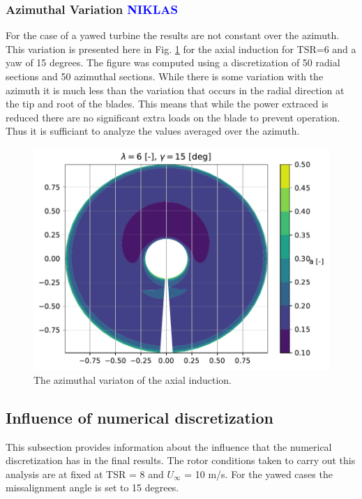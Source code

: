 \subsubsection{\textbf{Azimuthal Variation} \textcolor{blue}{NIKLAS}}
For the case of a yawed turbine the results are not constant over the azimuth. This variation is presented here in Fig. \ref{img:contour} for the axial induction for TSR=6 and a yaw of 15 degrees. The figure was computed using a discretization of 50 radial sections and 50 azimuthal sections. While there is some variation with the azimuth it is much less than the variation that occurs in the radial direction at the tip and root of the blades. This means that while the power extraced is reduced there are no significant extra loads on the blade to prevent operation. Thus it is sufficiant to analyze the values averaged over the azimuth.

\begin{figure}[htbp]
	\centering
	\includegraphics[height=0.45\textheight]{./img/yaw/contour-n_az-51.pdf}
	\caption{The azimuthal variaton of the axial induction.}
	\label{img:contour}
\end{figure}

\subsection{\textbf{Influence of numerical discretization} }

This subsection provides information about the influence that the numerical discretization has in the final results. The rotor conditions taken to carry out this analysis are at fixed at TSR = 8 and $U_{\infty} $ = 10 m/s. For the yawed cases the missalignment angle is set to 15 degrees. \\

